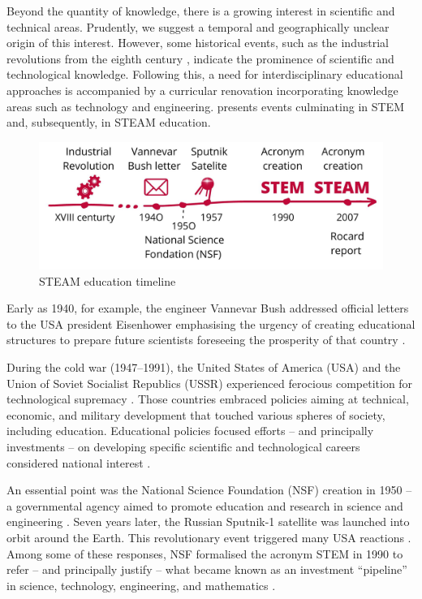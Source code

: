 \documentclass[english]{textolivre}
\begin{document}
Beyond the quantity of knowledge, there is a growing interest in scientific and technical areas. Prudently, we suggest a temporal and geographically unclear origin of this interest. However, some historical events, such as the industrial revolutions from the eighth century \cite{xu_fourth_2018}, indicate the prominence of scientific and technological knowledge. Following this, a need for interdisciplinary educational approaches is accompanied by a curricular renovation incorporating knowledge areas such as technology and engineering.  presents events culminating in STEM and, subsequently, in STEAM education.


\begin{figure}[htbp]
\centering
\begin{minipage}{.8\textwidth}
 \includegraphics[width=\textwidth]{imagem1.jpg}
 \caption{STEAM education timeline}
 \label{fig1}
\end{minipage}
\end{figure}

Early as 1940, for example, the engineer Vannevar Bush addressed official letters to the USA president Eisenhower emphasising the urgency of creating educational structures to prepare future scientists foreseeing the prosperity of that country \cite{chesky_introduction_2015}. 

During the cold war (1947–1991), the United States of America (USA) and the Union of Soviet Socialist Republics (USSR) experienced ferocious competition for technological supremacy \cite{chesky_introduction_2015}. Those countries embraced policies aiming at technical, economic, and military development that touched various spheres of society, including education. Educational policies focused efforts – and principally investments – on developing specific scientific and technological careers considered national interest \cite{catterall_brief_2017}.

An essential point was the National Science Foundation (NSF) creation in 1950 – a governmental agency aimed to promote education and research in science and engineering \cite{NSF1950}. Seven years later, the Russian Sputnik-1 satellite was launched into orbit around the Earth. This revolutionary event triggered many USA reactions \cite{perignat_steam_2019}. Among some of these responses, NSF formalised the acronym STEM in 1990 to refer – and principally justify – what became known as an investment “pipeline” in science, technology, engineering, and mathematics \cite{reynolds2009increasing, stephenson_increasing_2022}.
\end{document}
